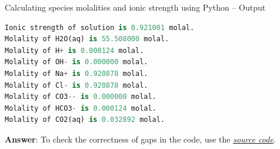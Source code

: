 %
%
\begin{frame}[fragile]{Calculating species molalities and ionic strength using Python -- Output}

\begin{lstlisting}[language=Python, caption=Calculating species molalities and ionic strength using Python -- Output]
Ionic strength of solution is 0.921001 molal.
Molality of H2O(aq) is 55.508000 molal.
Molality of H+ is 0.000124 molal.
Molality of OH- is 0.000000 molal.
Molality of Na+ is 0.920878 molal.
Molality of Cl- is 0.920878 molal.
Molality of CO3-- is 0.000000 molal.
Molality of HCO3- is 0.000124 molal.
Molality of CO2(aq) is 0.032892 molal.
\end{lstlisting}

\textbf{Answer}: To check the correctness of gaps in the code, use the  \href{https://polybox.ethz.ch/index.php/s/o0tt6lPtd8TBhoG}{\textcolor{indigo(dye)}{\it source code}}.

\end{frame}
%
